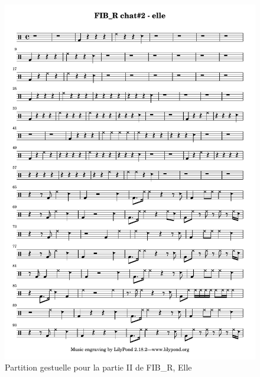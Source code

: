 \begin{figure}[!htbp]
	\includegraphics[width=\textwidth]{gfx/notation/FIBR-Chat2-Elle.pdf}
	\caption{Partition gestuelle pour la partie II de FIB\_R, Elle}
	\label{fig:notation:FIBR-chat2-Elle}
\end{figure}

